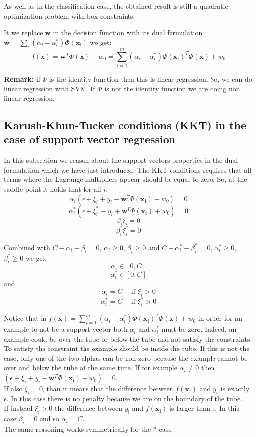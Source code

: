 As well as in the classification case, the obtained result is still a quadratic optimization problem with box constraints. \newline

It we replace $\pmb{w}$ in the decision function with its dual formulation $\pmb{w} = \sum_i (\alpha_i-\alpha_i^*) \Phi(\pmb{x_i})$ we get:
$$f(\pmb{x}) = \pmb{w}^T \Phi(\pmb{x}) + w_0 = \sum_{i=1}^m (\alpha_i - \alpha_i^*) \Phi(\pmb{x_i})^T \Phi(\pmb{x}) + w_0$$

\textbf{Remark:} if $\Phi$ is the identity function then this is linear regression. So, we can do linear regression with SVM. If $\Phi$ is not the identity function we are doing non linear regression.

\subsection{Karush-Khun-Tucker conditions (KKT) in the case of support vector regression}
In this subsection we reason about the support vectors properties in the dual formulation which we have just introduced. The KKT conditions requires that all terms where the Lagrange multipliers appear should be equal to zero. So, at the saddle point it holds that for all $i$:
$$\alpha_i (\epsilon + \xi_i + y_i - \pmb{w}^T \Phi(\pmb{x_i}) - w_0) = 0$$
$$\alpha_i^*(\epsilon + \xi_i^* - y_i + \pmb{w}^T \Phi(\pmb{x_i}) + w_0) = 0$$
$$\beta_i \xi_i = 0$$
$$\beta_i^* \xi_i^* = 0$$

Combined with $C - \alpha_i - \beta_i = 0$, $\alpha_i \geq 0$, $\beta_i \geq 0$ and $C - \alpha_i^* - \beta_i^* = 0$, $\alpha_i^* \geq 0$, $\beta_i^* \geq 0$ we get:
$$\alpha_i \in [0,C]$$
$$\alpha_i^* \in [0,C]$$
and
$$\alpha_i = C \quad \text{ if } \xi_i > 0$$
$$\alpha_i^* = C \quad \text{ if } \xi_i^* > 0$$

Notice that in $f(\pmb{x}) = \sum_{i=1}^m (\alpha_i - \alpha_i^*) \Phi(\pmb{x_i})^T \Phi(\pmb{x}) + w_0$ in order for an example to not be a support vector both $\alpha_i$ and $\alpha_i^*$ must be zero. Indeed, an example could be over the tube or below the tube and not satisfy the constraints. To satisfy the constraint the example should be inside the tube. If this is not the case, only one of the two alphas can be non zero because the example cannot be over and below the tube at the same time. \newline
If for example $\alpha_i \neq 0$ then $(\epsilon + \xi_i + y_i - \pmb{w}^T \Phi(\pmb{x_i}) - w_0) = 0$.\\ If also $\xi_i = 0$, than it means that the difference between $f(\pmb{x_i})$ and $y_i$ is exactly $\epsilon$. In this case there is no penalty because we are on the boundary of the tube.\\If instead $\xi_i > 0$ the difference between $y_i$ and $f(\pmb{x_i})$ is larger than $\epsilon$. In this case $\beta_i = 0$ and so $\alpha_i = C$.\\
The same reasoning works symmetrically for the $*$ case. \newline

